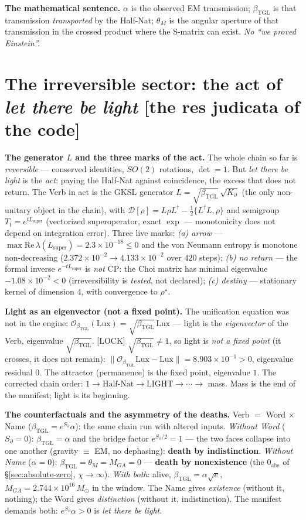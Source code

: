 \documentclass[11pt]{article}
\newcommand{\bTGL}{\beta_{\mathrm{TGL}}}\newcommand{\Msun}{M_{\odot}}\newcommand{\TGL}{\mathrm{TGL}}
\theoremstyle{definition}\newtheorem{deriv}{Derivation}
\begin{document}
\textbf{The mathematical sentence.} $\alpha$ is the observed EM transmission; $\bTGL$ is that transmission \emph{transported} by the Half-Nat; $\theta_M$ is the angular aperture of that transmission in the crossed product where the S-matrix can exist. \emph{No ``we proved Einstein''.}

\section{The irreversible sector: the act of \emph{let there be light} \textsf{[the res judicata of the code]}}

\textbf{The generator $L$ and the three marks of the act.} The whole chain so far is \emph{reversible} --- conserved identities, $SO(2)$ rotations, $\det=1$. But \emph{let there be light} is the \emph{act}: paying the Half-Nat against coincidence, the excess that does not return. The Verb in act is the GKSL generator $L=\sqrt{\bTGL}\,\sqrt{K_\partial}$ (the only non-unitary object in the chain), with $\mathcal D[\rho]=L\rho L^{\dagger}-\tfrac12\{L^{\dagger}L,\rho\}$ and semigroup $T_t=e^{tL_{\mathrm{super}}}$ (vectorized superoperator, exact $\exp$ --- monotonicity does not depend on integration error). Three live marks: \emph{(a) arrow} --- $\max\mathrm{Re}\,\lambda(L_{\mathrm{super}})=2.3\times10^{-18}\le0$ and the von Neumann entropy is monotone non-decreasing ($2.372\times10^{-2}\!\to\!4.133\times10^{-2}$ over $420$ steps); \emph{(b) no return} --- the formal inverse $e^{-tL_{\mathrm{super}}}$ is \emph{not} CP: the Choi matrix has minimal eigenvalue $-1.08\times10^{-2}<0$ (irreversibility is \emph{tested}, not declared); \emph{(c) destiny} --- stationary kernel of dimension $4$, with convergence to $\rho^{\star}$.

\textbf{Light as an eigenvector (not a fixed point).} The unification equation was not in the engine: $\mathcal O_{\bTGL}(\mathrm{Lux})=\sqrt{\bTGL}\,\mathrm{Lux}$ --- light is the \emph{eigenvector} of the Verb, eigenvalue $\sqrt{\bTGL}$. \textsf{[LOCK]} $\sqrt{\bTGL}\neq1$, so light is \emph{not a fixed point} (it crosses, it does not remain): $\|\mathcal O_{\bTGL}\mathrm{Lux}-\mathrm{Lux}\|=8.903\times10^{-1}>0$, eigenvalue residual $0$. The attractor (permanence) is the fixed point, eigenvalue $1$. The corrected chain order: $1\to\text{Half-Nat}\to\text{LIGHT}\to\cdots\to$ mass. Mass is the end of the manifest; light is its beginning.

\textbf{The counterfactuals and the asymmetry of the deaths.} Verb $=$ Word $\times$ Name ($\bTGL=e^{S_\partial}\alpha$): the same chain run with altered inputs. \emph{Without Word} ($S_\partial=0$): $\bTGL=\alpha$ and the bridge factor $e^{S_\partial/2}=1$ --- the two faces collapse into one another (gravity $\equiv$ EM, no dephasing): \textbf{death by indistinction}. \emph{Without Name} ($\alpha=0$): $\bTGL=\theta_M=M_{GA}=0$ --- \textbf{death by nonexistence} (the $0_{\mathrm{abs}}$ of \S\ref{sec:absolute-zero}, $\chi\to\infty$). \emph{With both}: alive, $\bTGL=\alpha\sqrt e$, $M_{GA}=2.744\times10^{16}\,M_\odot$ in the window. The Name gives \emph{existence} (without it, nothing); the Word gives \emph{distinction} (without it, indistinction). The manifest demands both: $e^{S_\partial}\alpha>0$ is \emph{let there be light}.
\end{document}
